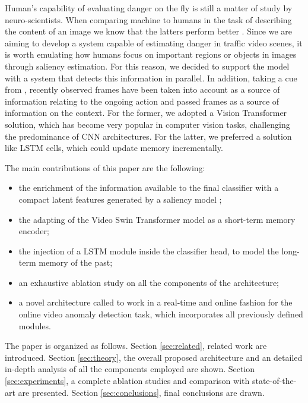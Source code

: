 Human's capability of evaluating danger on the fly is still a matter of study by neuro-scientists.
When comparing machine to humans in the task of describing the content of an image we know that the latters perform better \cite{jiang2015salicon}.
Since we are aiming to develop a system capable of estimating danger in traffic video scenes, it is worth emulating how humans focus on important regions or objects in images through saliency estimation.
For this reason, we decided to support the model with a system that detects this information in parallel.
In addition, taking a cue from \cite{xu2021long}, recently observed frames have been taken into account as a source of information relating to the ongoing action and passed frames as a source of information on the context.
For the former, we adopted a Vision Transformer \cite{DBLP:conf/iclr/DosovitskiyB0WZ21} solution, which has become very popular in computer vision tasks, challenging the predominance of CNN architectures.
For the latter, we preferred a solution like LSTM cells, which could update memory incrementally.

The main contributions of this paper are the following:
\begin{itemize}
    \item the enrichment of the information available to the final classifier with a compact latent features generated by a saliency model \cite{cornia2016deep};
    \item the adapting of the Video Swin Transformer model \cite{liu_video_2022} as a short-term memory encoder;
    \item the injection of a LSTM module inside the classifier head, to model the long-term memory of the past;
    \item an exhaustive ablation study on all the components of the architecture;
    \item a novel architecture called  to work in a real-time and online fashion for the online video anomaly detection task, which incorporates all previously defined modules.
\end{itemize}

The paper is organized as follows.
Section \ref{sec:related}, related work are introduced.
Section \ref{sec:theory}, the overall proposed architecture and an detailed in-depth analysis of all the components employed are shown.
Section \ref{sec:experiments}, a complete ablation studies and comparison with state-of-the-art are presented.
Section \ref{sec:conclusions}, final conclusions are drawn.